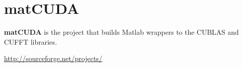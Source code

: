
\chapter{matCUDA}
\label{chap:matcuda}

{\bf matCUDA} is the project that builds Matlab wrappers to the CUBLAS
and CUFFT libraries.

\url{http://sourceforge.net/projects/}



